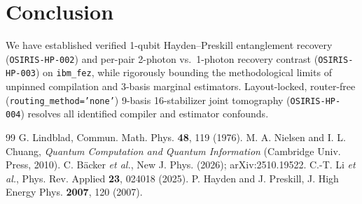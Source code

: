 \documentclass[aps,prxquantum,reprint,superscriptaddress,floatfix]{revtex4-2}
\begin{document}
\section{Conclusion}
We have established verified 1-qubit Hayden--Preskill entanglement recovery (\texttt{OSIRIS-HP-002}) and per-pair 2-photon vs.\ 1-photon recovery contrast (\texttt{OSIRIS-HP-003}) on \texttt{ibm\_fez}, while rigorously bounding the methodological limits of unpinned compilation and 3-basis marginal estimators. Layout-locked, router-free (\texttt{routing\_method='none'}) 9-basis 16-stabilizer joint tomography (\texttt{OSIRIS-HP-004}) resolves all identified compiler and estimator confounds.

\begin{thebibliography}{99}
 G. Lindblad, Commun. Math. Phys. \textbf{48}, 119 (1976).
 M. A. Nielsen and I. L. Chuang, \textit{Quantum Computation and Quantum Information} (Cambridge Univ. Press, 2010).
 C. B\"acker \textit{et al.}, New J. Phys. (2026); arXiv:2510.19522.
 C.-T. Li \textit{et al.}, Phys. Rev. Applied \textbf{23}, 024018 (2025).
 P. Hayden and J. Preskill, J. High Energy Phys. \textbf{2007}, 120 (2007).
\end{thebibliography}
\end{document}
